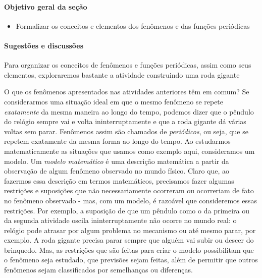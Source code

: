 \clearpage
\begin{texto}
{	\def\currentcolor{session4}
	\paragraph{Objetivo geral da seção}
	\begin{itemize}
	\item Formalizar os conceitos e elementos dos fenômenos e das
	funções periódicas
	\end{itemize}

	\paragraph{Sugestões e discussões}

	Para organizar os conceitos de fenômenos e
	funções periódicas, assim como seus elementos,
	exploraremos bastante a atividade construindo uma roda
	gigante

}
\end{texto}
\label{trig-arg1}

O que os fenômenos apresentados nas atividades anteriores têm em comum? Se considerarmos uma situação ideal em que o mesmo fenômeno se repete \textit{exatamente} da mesma maneira ao longo do tempo, podemos dizer que o pêndulo do relógio sempre vai e volta ininterruptamente e que a roda gigante dá várias voltas sem parar. Fenômenos assim são chamados de \textit{periódicos}, ou seja, que se repetem exatamente da mesma forma ao longo do tempo. Ao estudarmos matematicamente as situações que usamos como exemplo aqui, consideramos um modelo. Um \textit{modelo matemático} é uma descrição matemática a partir da observação de algum fenômeno observado no mundo físico. Claro que, ao fazermos essa descrição em termos matemáticos, precisamos fazer algumas restrições e suposições que não necessariamente ocorreram ou ocorreriam de fato no fenômeno observado - mas, com um modelo, é razoável que consideremos essas restrições. Por exemplo, a suposição de que um pêndulo como o da primeira ou da segunda atividade oscila ininterruptamente não ocorre no mundo real: o relógio pode atrasar por algum problema no mecanismo ou até mesmo parar, por exemplo. A roda gigante precisa parar sempre que alguém vai subir ou descer do brinquedo. Mas, as restrições que são feitas para criar o modelo possibilitam que o fenômeno seja estudado, que previsões sejam feitas, além de permitir que outros fenômenos sejam classificados por semelhanças ou diferenças.

